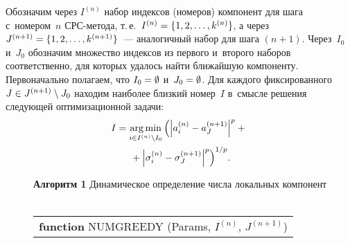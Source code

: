 \begin{multicols}{2}
Обозначим через $I^{(n)}$ набор индексов (номеров) компонент 
для шага с~номером~$n$ СРС-ме\-то\-да, т.\,е.\ $I^{(n)}
\hm=\{1,2,\ldots,k^{(n)}\}$, а через 
$J^{(n+1)}\hm=\{1,2,\ldots,k^{(n+1)}\}$~--- 
аналогичный набор для шага $(n+1)$. Через~$I_0$ и~$J_0$ 
обозначим множество индексов из первого и~второго наборов 
соответственно, для которых удалось найти ближайшую компоненту. 
Первоначально полагаем, что $I_0\hm=\emptyset$ и~$J_0\hm=\emptyset$. 
Для каждого фиксированного $J\hm\in J^{(n+1)}\setminus J_0$ 
находим наиболее близ\-кий номер~$I$ в~смыс\-ле решения сле\-ду\-ющей 
оптимизационной задачи:
\begin{multline}
\label{I}
I=\mathop{\mathrm{arg}\,\mathrm{min}}\limits_{i\in I^{(n)} 
\setminus I_0}\left(\left|a_i^{(n)}-a_J^{(n+1)}\right|^p+{}\right.\\
\left.{}+\left|\sigma_i^{(n)}-\sigma_J^{(n+1)}\right|^p \right)^{1/p}\!.
\end{multline}

\renewcommand{\figurename}{\protect\bf Алгоритм}

\setcounter{figure}{0}
\begin{figure*}[b]
{\small \begin{center}
\textbf{Алгоритм 1} Динамическое определение числа локальных компонент\\
{\ }\\[-6pt]
\begin{tabular}{l}
\hline

\textbf{function} {\normalsize{N}}UM{\normalsize{G}}REEDY (Params, $ I^{(n)}$, $J^{(n+1)}$)\\


\end{tabular}
\end{center}}
\end{figure*}
\end{multicols}
